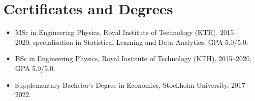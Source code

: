 \documentclass[11pt,a4paper]{article}
\begin{document}
\section*{Certificates and Degrees}

\begin{itemize}
  \item MSc in Engineering Physics, Royal Institute of Technology (KTH), 2015--2020, specialisation in Statistical Learning and Data Analytics, GPA 5.0/5.0.
  \item BSc in Engineering Physics, Royal Institute of Technology (KTH), 2015--2020, GPA 5.0/5.0.
  \item Supplementary Bachelor's Degree in Economics, Stockholm University, 2017--2022.
\end{itemize}
\end{document}
